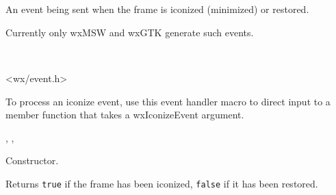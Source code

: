 
\section{}\label{wxiconizeevent}

An event being sent when the frame is iconized (minimized) or restored.

Currently only wxMSW and wxGTK generate such events.


\\


<wx/event.h>


To process an iconize event, use this event handler macro to direct input to a
member function that takes a wxIconizeEvent argument.

\twocolwidtha{7cm}
\begin{twocollist}\itemsep=0pt
\end{twocollist}%


,\rtfsp
{},\rtfsp
{}


\label{wxiconizeeventctor}


Constructor.

\label{wxiconizeeventiconized}


Returns {\tt true} if the frame has been iconized, {\tt false} if it has been
restored.

